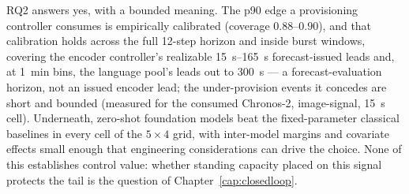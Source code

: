 RQ2 answers yes, with a bounded meaning. The p90 edge a provisioning
controller consumes is empirically calibrated (coverage $0.88$--$0.90$),
and that calibration holds across the full 12-step horizon and inside
burst windows, covering the encoder controller's realizable
\SIrange{15}{165}{\second} forecast-issued leads and, at \SI{1}{\minute}
bins, the language pool's leads out to \SI{300}{\second} --- a
forecast-evaluation horizon, not an issued encoder lead; the under-provision
events it concedes are short and bounded (measured for the consumed
Chronos-2, image-signal, \SI{15}{\second} cell). Underneath, zero-shot foundation
models beat the fixed-parameter classical baselines in every cell of the
$5{\times}4$ grid, with inter-model margins and covariate effects small
enough that engineering considerations can drive the choice. None of this
establishes control value: whether standing capacity placed on this
signal protects the tail is the question of Chapter~\ref{cap:closedloop}.
